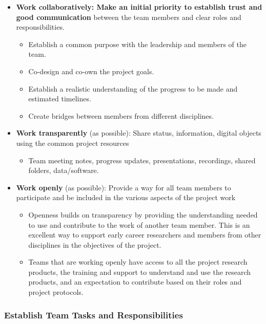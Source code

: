 \documentclass[
  letterpaper,
  DIV=11,
  numbers=noendperiod]{scrreport}
\providecommand{\tightlist}{%
  \setlength{\itemsep}{0pt}\setlength{\parskip}{0pt}}\usepackage{longtable,booktabs,array}
\begin{document}
\begin{itemize}
\tightlist
\item
  \textbf{Work collaboratively: Make an initial priority to establish
  trust and good communication }between the team members and clear roles
  and responsibilities.

  \begin{itemize}
  \tightlist
  \item
    Establish a common purpose with the leadership and members of the
    team.
  \item
    Co-design and co-own the project goals.
  \item
    Establish a realistic understanding of the progress to be made and
    estimated timelines.
  \item
    Create bridges between members from different disciplines.
  \end{itemize}
\item
  \textbf{Work transparently} (as possible): Share status, information,
  digital objects using the common project resources

  \begin{itemize}
  \tightlist
  \item
    Team meeting notes, progress updates, presentations, recordings,
    shared folders, data/software.
  \end{itemize}
\item
  \textbf{Work openly} (as possible): Provide a way for all team members
  to participate and be included in the various aspects of the project
  work

  \begin{itemize}
  \tightlist
  \item
    Openness builds on transparency by providing the understanding
    needed to use and contribute to the work of another team member.
    This is an excellent way to support early career researchers and
    members from other disciplines in the objectives of the project.
  \item
    Teams that are working openly have access to all the project
    research products, the training and support to understand and use
    the research products, and an expectation to contribute based on
    their roles and project protocols.
  \end{itemize}
\end{itemize}

\hypertarget{establish-team-tasks-and-responsibilities}{%
\subsubsection{Establish Team Tasks and
Responsibilities}\label{establish-team-tasks-and-responsibilities}}
\end{document}
